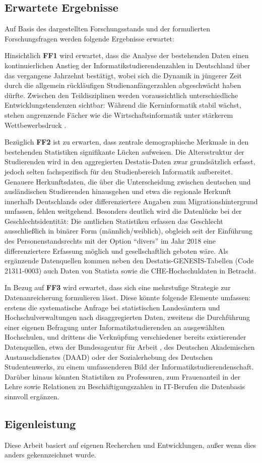 \subsection{Erwartete Ergebnisse}

Auf Basis des dargestellten Forschungsstands und der formulierten Forschungsfragen werden folgende Ergebnisse erwartet:

Hinsichtlich \textbf{FF1} wird erwartet, dass die Analyse der bestehenden Daten einen kontinuierlichen Anstieg der Informatikstudierendenzahlen in Deutschland über das vergangene Jahrzehnt bestätigt, wobei sich die Dynamik in jüngerer Zeit durch die allgemein rückläufigen Studienanfängerzahlen abgeschwächt haben dürfte. Zwischen den Teildisziplinen werden voraussichtlich unterschiedliche Entwicklungstendenzen sichtbar: Während die Kerninformatik stabil wächst, stehen angrenzende Fächer wie die Wirtschaftsinformatik unter stärkerem Wettbewerbsdruck \cite{schauerWirtschaftsinformatik2021}.

Bezüglich \textbf{FF2} ist zu erwarten, dass zentrale demographische Merkmale in den bestehenden Statistiken signifikante Lücken aufweisen. Die Altersstruktur der Studierenden wird in den aggregierten Destatis-Daten zwar grundsätzlich erfasst, jedoch selten fachspezifisch für den Studienbereich Informatik aufbereitet. Genauere Herkunftsdaten, die über die Unterscheidung zwischen deutschen und ausländischen Studierenden hinausgehen und etwa die regionale Herkunft innerhalb Deutschlands oder differenziertere Angaben zum Migrationshintergrund umfassen, fehlen weitgehend. Besonders deutlich wird die Datenlücke bei der Geschlechtsidentität: Die amtlichen Statistiken erfassen das Geschlecht ausschließlich in binärer Form (männlich/weiblich), obgleich seit der Einführung des Personenstandsrechts mit der Option ``divers'' im Jahr 2018 eine differenziertere Erfassung möglich und gesellschaftlich geboten wäre. Als ergänzende Datenquellen kommen neben den Destatis-GENESIS-Tabellen (Code 21311-0003) auch Daten von Statista sowie die CHE-Hochschuldaten in Betracht.

In Bezug auf \textbf{FF3} wird erwartet, dass sich eine mehrstufige Strategie zur Datenanreicherung formulieren lässt. Diese könnte folgende Elemente umfassen: erstens die systematische Anfrage bei statistischen Landesämtern und Hochschulverwaltungen nach disaggregierten Daten, zweitens die Durchführung einer eigenen Befragung unter Informatikstudierenden an ausgewählten Hochschulen, und drittens die Verknüpfung verschiedener bereits existierender Datenquellen, etwa der Bundesagentur für Arbeit \cite{kaulKarrierestart2016}, des Deutschen Akademischen Austauschdienstes (DAAD) oder der Sozialerhebung des Deutschen Studentenwerks, zu einem umfassenderen Bild der Informatikstudierendenschaft. Darüber hinaus könnten Statistiken zu Professuren, zum Frauenanteil in der Lehre sowie Relationen zu Beschäftigungszahlen in IT-Berufen die Datenbasis sinnvoll ergänzen.

\subsection{Eigenleistung}
Diese Arbeit basiert auf eigenen Recherchen und Entwicklungen, außer wenn dies anders gekennzeichnet wurde.
